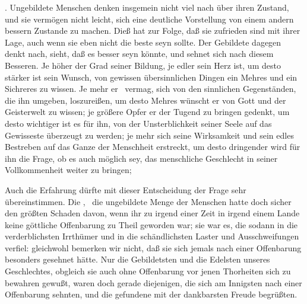 \begin{aufza}
\item {}. Ungebildete Menschen denken insgemein nicht viel nach über ihren Zustand, und sie vermögen nicht leicht, sich eine deutliche Vorstellung von einem andern bessern Zustande zu machen. Dieß hat zur Folge, daß sie zufrieden sind mit ihrer Lage, auch wenn sie eben nicht die beste seyn sollte. Der Gebildete dagegen denkt nach, sieht, daß es besser seyn könnte, und sehnet sich nach diesem Besseren. Je höher der Grad seiner Bildung, je edler sein Herz ist, um desto stärker ist sein Wunsch, von gewissen übersinnlichen Dingen ein Mehres und ein Sichreres zu wissen. Je mehr er \zB\ vermag, sich von den sinnlichen Gegenständen, die ihn umgeben, loszureißen, um desto Mehres wünscht er von Gott und der Geisterwelt zu wissen; je größere Opfer er der Tugend zu bringen gedenkt, um desto wichtiger ist es für ihn, von der Unsterblichkeit seiner Seele auf das Gewisseste überzeugt zu werden; je mehr sich seine Wirksamkeit und sein edles Bestreben auf das Ganze der Menschheit erstreckt, um desto dringender wird für ihn die Frage, ob es auch möglich sey, das menschliche Geschlecht in seiner Vollkommenheit weiter zu bringen; \usw ~
\begin{RWanm}
Auch die Erfahrung dürfte mit dieser Entscheidung der Frage sehr übereinstimmen. Die , \dh\ die ungebildete Menge der Menschen hatte doch sicher den größten Schaden davon, wenn ihr zu irgend einer Zeit in irgend einem Lande keine göttliche Offenbarung zu Theil geworden war; sie war es, die sodann in die verderblichsten Irrthümer und in die schändlichsten Laster und Ausschweifungen verfiel: gleichwohl bemerken wir nicht, daß sie sich jemals nach einer Offenbarung besonders gesehnet hätte. Nur die Gebildetsten und die Edelsten unseres Geschlechtes, obgleich sie auch ohne Offenbarung vor jenen Thorheiten sich zu bewahren gewußt, waren doch gerade diejenigen, die sich am Innigsten nach einer Offenbarung sehnten, und die gefundene mit der dankbarsten Freude begrüßten. 
\end{RWanm}
\end{aufza}

